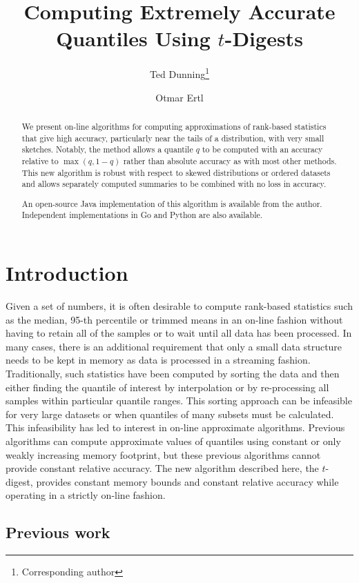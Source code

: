 \documentclass[]{statsoc}
\title[Accurate Quantiles Using $t$-Digests]{Computing Extremely Accurate Quantiles Using $t$-Digests}
\author[Dunning \it{et al.}]{Ted Dunning\thanks{Corresponding author}}
\author[Dunning and Ertl]{Otmar Ertl}
\date{}                                           %
\begin{document}
\begin{abstract}
We present on-line algorithms for computing approximations of rank-based statistics that give high accuracy, particularly near the tails of a distribution, with very small sketches.  Notably, the method allows a quantile $q$ to be computed with an accuracy relative to $\max(q, 1-q)$ rather than absolute accuracy as with most other methods.  This new algorithm is robust with respect to skewed distributions or ordered datasets and allows separately computed summaries to be combined with no loss in accuracy.

An open-source Java implementation of this algorithm is available from the author. Independent implementations in Go and Python are also available.


\end{abstract}
\maketitle
\section{Introduction}
Given a set of numbers, it is often desirable to compute rank-based statistics such as the median, 95-th percentile or trimmed means in an on-line fashion without having to retain all of the samples or to wait until all data has been processed. In many cases, there is an additional requirement that only a small data structure needs to be kept in memory as data is processed in a streaming fashion.  Traditionally, such statistics have been computed by sorting the data and then either finding the quantile of interest by interpolation or by re-processing all samples within particular quantile ranges.  This sorting approach can be infeasible for very large datasets or when quantiles of many subsets must be calculated. This infeasibility has led to interest in on-line approximate algorithms. Previous algorithms can compute approximate values of quantiles using constant or only weakly increasing memory footprint, but these previous algorithms cannot provide constant relative accuracy.  The new algorithm described here, the $t$-digest, provides constant memory bounds and constant relative accuracy while operating in a strictly on-line fashion.

\subsection{Previous work}
\end{document}
